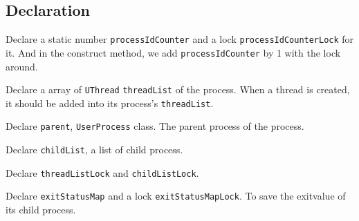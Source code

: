 \documentclass{article}
\begin{document}
\subsection{Declaration}
\begin{compactitem}
\item Declare a static number \texttt{processIdCounter} and a lock \texttt{processIdCounterLock} for it. And in the construct method, we add \texttt{processIdCounter} by 1 with the lock around.
\item Declare a array of \texttt{UThread} \texttt{threadList} of the process. When a thread is created, it should be added into its process's 
	\texttt{threadList}.
\item Declare \texttt{parent}, \texttt{UserProcess} class. The parent process of the process.
\item Declare \texttt{childList}, a list of child process.
\item Declare \texttt{threadListLock} and \texttt{childListLock}.
\item Declare \texttt{exitStatusMap} and a lock \texttt{exitStatusMapLock}. To save the exitvalue of its child process.
\end{compactitem}
\end{document}
